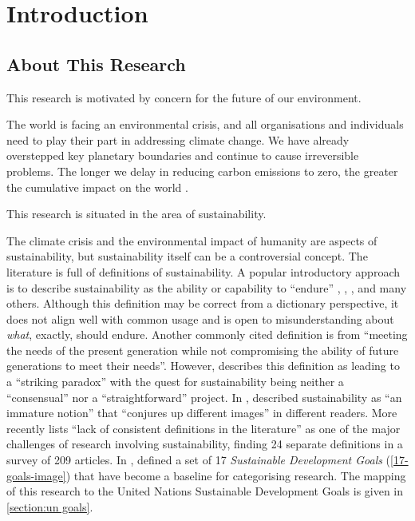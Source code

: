 \chapter{Introduction}
\label{chapter:introduction}

\section{About This Research}
\label{section:intro about}

\begin{leftbar}
This research is motivated by concern for the future of our environment.
\end{leftbar}

The world is facing an environmental crisis, and all organisations and individuals need to play their part in addressing climate change. We have already overstepped key planetary boundaries \citep{Steffen2015} and continue to cause irreversible problems. The longer we delay in reducing carbon emissions to zero, the greater the cumulative impact on the world \citep{Pierrehumbert2019}.

\begin{leftbar}
This research is situated in the area of sustainability.
\end{leftbar}

The climate crisis and the environmental impact of humanity are aspects of sustainability, but sustainability itself can be a controversial concept. The literature is full of definitions of sustainability. A popular introductory approach is to describe sustainability as the ability or capability to \enquote{endure} \citep{Mengesha2024}, \citep{Dixit2024}, \citep{Venters2023}, and many others. Although this definition may be correct from a dictionary perspective, it does not align well with common usage and is open to misunderstanding about \emph{what}, exactly, should endure. Another commonly cited definition is from \citet{Brundtland1987} \enquote{meeting the needs of the present generation while not compromising the ability of future generations to meet their needs}. However, \citet{Owens2003} describes this definition as leading to a \enquote{striking paradox} with the quest for sustainability being neither a \enquote{consensual} nor a \enquote{straightforward} project. In \citeyear{Allen1993}, \citeauthor{Allen1993} described sustainability as \enquote{an immature notion} that \enquote{conjures up different images} in different readers. More recently \citet{Moore2017} lists \enquote{lack of consistent definitions in the literature} as one of the major challenges of research involving sustainability, finding 24 separate definitions in a survey of 209 articles. In \citeyear{UnitedNations2015}, \citeauthor{UnitedNations2015} defined a set of 17 \emph{Sustainable Development Goals} (\autoref{17-goals-image}) that have become a baseline for categorising research. The mapping of this research to the United Nations Sustainable Development Goals is given in \autoref{section:un goals}.

